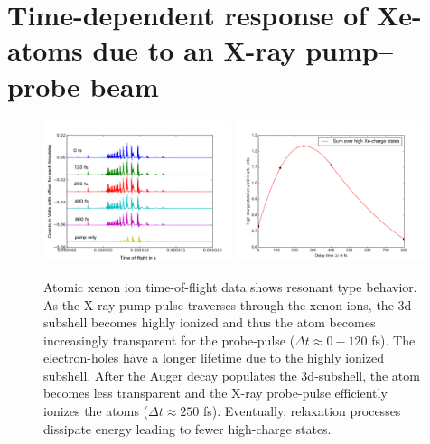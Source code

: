 \section{Time-dependent response of Xe-atoms due to an X-ray pump--probe beam}\label{sec:time-resolved-xe-atoms}
\begin{figure}
	\centering
		\includegraphics[width=0.49\textwidth]{images/results/TOF-atomic-xenon.png}
		\includegraphics[width=0.49\textwidth]{images/results/atomic-charge-state-time-resolved.pdf}
	\caption[Time-resolved answer of atomic xenon in TOF spectroscopy.]{Atomic xenon ion time-of-flight data shows resonant type behavior. As the X-ray pump-pulse traverses through the xenon ions, the 3d-subshell becomes highly ionized and thus the atom becomes increasingly transparent for the probe-pulse ($\Delta t \approx 0-120$ fs). The electron-holes have a longer lifetime due to the highly ionized subshell. After the Auger decay populates the 3d-subshell, the atom becomes less transparent and the X-ray probe-pulse efficiently ionizes the atoms ($\Delta t \approx 250$ fs). Eventually, relaxation processes dissipate energy leading to fewer high-charge states.}
	\label{fig:TOF-atomic-xenon}
\end{figure}
